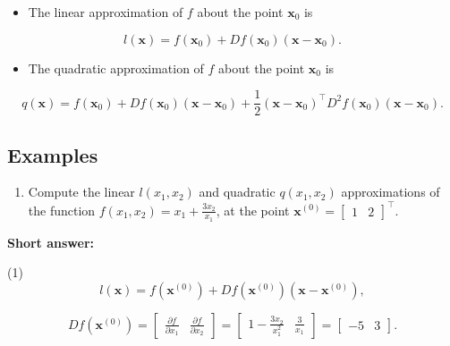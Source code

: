 \begin{itemize}
	\item The linear approximation of \(f\) about the point \(\boldsymbol{x}_{0}\) is
\end{itemize}

\begin{equation*}
	l(\boldsymbol{x})=f\left(\boldsymbol{x}_{0}\right)+D f\left(\boldsymbol{x}_{0}\right)\left(\boldsymbol{x}-\boldsymbol{x}_{0}\right) .
\end{equation*}

\begin{itemize}
	\item The quadratic approximation of \(f\) about the point \(\boldsymbol{x}_{0}\) is
\end{itemize}

\begin{equation*}
	q(\boldsymbol{x})=f\left(\boldsymbol{x}_{0}\right)+D f\left(\boldsymbol{x}_{0}\right)\left(\boldsymbol{x}-\boldsymbol{x}_{0}\right)+\frac{1}{2}\left(\boldsymbol{x}-\boldsymbol{x}_{0}\right)^{\top} D^{2} f\left(\boldsymbol{x}_{0}\right)\left(\boldsymbol{x}-\boldsymbol{x}_{0}\right) .
\end{equation*}

\subsection{Examples}

\begin{enumerate}
	\item Compute the linear \(l\left(x_{1}, x_{2}\right)\) and quadratic \(q\left(x_{1}, x_{2}\right)\) approximations of the function \(f\left(x_{1}, x_{2}\right)=x_{1}+\frac{3 x_{2}}{x_{1}}\), at the point \(\boldsymbol{x}^{(0)}=\left[\begin{array}{ll}1 & 2\end{array}\right]^{\top}\).
\end{enumerate}

\textbf{Short answer:}

(1) \[l(\boldsymbol{x})=f\left(\boldsymbol{x}^{(0)}\right)+D f\left(\boldsymbol{x}^{(0)}\right)\left(\boldsymbol{x}-\boldsymbol{x}^{(0)}\right),\]

\begin{equation*}
	D f(\boldsymbol{x}^{(0)})
	=\left[\begin{array}{ll}
		\frac{\partial f}{\partial x_{1}} & \frac{\partial f}{\partial x_{2}}
		\end{array}
		\right]
	=\left[\begin{array}{ll}
		1-\frac{3 x_{2}}{x_{1}^{2}} & \frac{3}{x_{1}}
		\end{array}
		\right]
	=\left[\begin{array}{ll}
		-5 & 3
	\end{array}\right].
\end{equation*}

